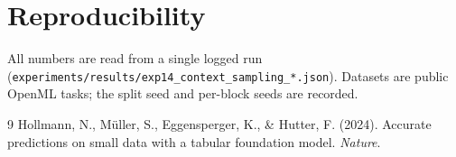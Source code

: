 \documentclass[11pt,a4paper]{article}
\begin{document}
\section*{Reproducibility}

All numbers are read from a single logged run
(\texttt{experiments/results/exp14\_context\_sampling\_*.json}). Datasets are
public OpenML tasks; the split seed and per-block seeds are recorded.

\begin{thebibliography}{9}
Hollmann, N., Müller, S., Eggensperger, K., \& Hutter, F. (2024).
Accurate predictions on small data with a tabular foundation model.
\textit{Nature}.
\end{thebibliography}
\end{document}
